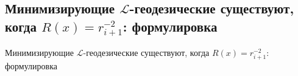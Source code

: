\subsection{\texorpdfstring{Минимизирующие $\mathcal{L}$-геодезические существуют, когда $R(x)=r^{-2}_{i+1}$: формулировка}{Минимизирующие L-геодезические существуют, когда R(x)≤ri+1-2 : формулировка}}

Минимизирующие $\mathcal{L}$-геодезические существуют, когда $R(x)=r^{-2}_{i+1}$: формулировка